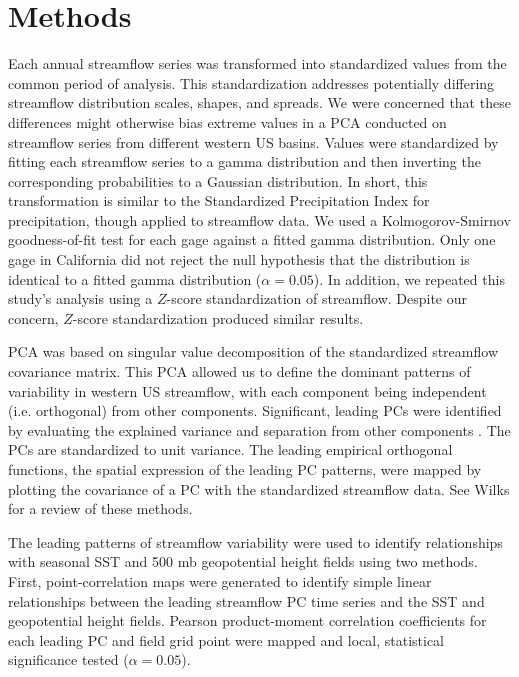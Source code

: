 \documentclass[final, double]{ua-thesis}
\begin{document}
\section{Methods}

Each annual streamflow series was transformed into standardized values from the common period of analysis. This standardization addresses potentially differing streamflow distribution scales, shapes, and spreads. We were concerned that these differences might otherwise bias extreme values in a PCA conducted on streamflow series from different western US basins. Values were standardized by fitting each streamflow series to a gamma distribution and then inverting the corresponding probabilities to a Gaussian distribution. In short, this transformation is similar to the Standardized Precipitation Index \citep{1mckee_relationship_1993} for precipitation, though applied to streamflow data. We used a Kolmogorov-Smirnov goodness-of-fit test for each gage against a fitted gamma distribution. Only one gage in California did not reject the null hypothesis that the distribution is identical to a fitted gamma distribution ($\alpha = 0.05$). In addition, we repeated this study's analysis using a $Z$-score standardization of streamflow. Despite our concern, $Z$-score standardization produced similar results.

PCA was based on singular value decomposition of the standardized streamflow covariance matrix. This PCA allowed us to define the dominant patterns of variability in western US streamflow, with each component being independent (i.e. orthogonal) from other components. Significant, leading PCs were identified by evaluating the explained variance and separation from other components \citep{1north_sampling_1982}. The PCs are standardized to unit variance. The leading empirical orthogonal functions, the spatial expression of the leading PC patterns, were mapped by plotting the covariance of a PC with the standardized streamflow data. See Wilks \citet{1wilks_statistical_2006} for a review of these methods.

The leading patterns of streamflow variability were used to identify relationships with  seasonal SST and 500 mb geopotential height fields using two methods. First, point-correlation maps were generated to identify simple linear relationships between the leading streamflow PC time series and the SST and geopotential height fields. Pearson product-moment correlation coefficients for each leading PC and field grid point were mapped and local, statistical significance tested ($\alpha = 0.05$). 
\end{document}
